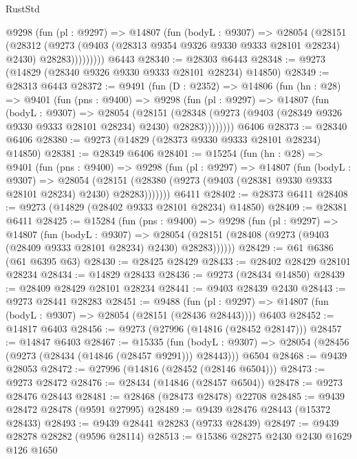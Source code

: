 \begin{lexlean}{RustStd}
\begin{coremodule}
{\begin{coremodule}
{{{{{{{{{{{{{{{{{{{{{{{{{{{{{{{{{{{{{{{{{{{{{{{{{{{{{{{          @9298
            (fun (pl : @9297) =>
            @14807
              (fun (bodyL : @9307) =>
              @28054
                (@28151
                  (@28312
                    (@9273
                      (@9403 (@28313 @9354 @9326 @9330 @9333 @28101 @28234) @2430)
                      @28283)))))))))
    @6443
@28340 := @28303 @6443
@28348 := @9273 (@14829 (@28340 @9326 @9330 @9333 @28101 @28234) @14850)
@28349 := @28313 @6443
@28372 := @9491
    (fun (D : @2352) =>
    @14806
      (fun (hn : @28) =>
      @9401
        (fun (pns : @9400) =>
        @9298
          (fun (pl : @9297) =>
          @14807
            (fun (bodyL : @9307) =>
            @28054
              (@28151
                (@28348 (@9273 (@9403 (@28349 @9326 @9330 @9333 @28101 @28234) @2430) @28283))))))))
    @6406
@28373 := @28340 @6406
@28380 := @9273 (@14829 (@28373 @9330 @9333 @28101 @28234) @14850)
@28381 := @28349 @6406
@28401 := @15254
    (fun (hn : @28) =>
    @9401
      (fun (pns : @9400) =>
      @9298
        (fun (pl : @9297) =>
        @14807
          (fun (bodyL : @9307) =>
          @28054
            (@28151 (@28380 (@9273 (@9403 (@28381 @9330 @9333 @28101 @28234) @2430) @28283)))))))
    @6411
@28402 := @28373 @6411
@28408 := @9273 (@14829 (@28402 @9333 @28101 @28234) @14850)
@28409 := @28381 @6411
@28425 := @15284
    (fun (pns : @9400) =>
    @9298
      (fun (pl : @9297) =>
      @14807
        (fun (bodyL : @9307) =>
        @28054 (@28151 (@28408 (@9273 (@9403 (@28409 @9333 @28101 @28234) @2430) @28283))))))
@28429 := @61 @6386 (@61 @6395 @63)
@28430 := @28425 @28429
@28433 := @28402 @28429 @28101 @28234
@28434 := @14829 @28433
@28436 := @9273 (@28434 @14850)
@28439 := @28409 @28429 @28101 @28234
@28441 := @9403 @28439 @2430
@28443 := @9273 @28441 @28283
@28451 := @9488
    (fun (pl : @9297) => @14807 (fun (bodyL : @9307) => @28054 (@28151 (@28436 @28443))))
    @6403
@28452 := @14817 @6403
@28456 := @9273 (@27996 (@14816 (@28452 @28147)))
@28457 := @14847 @6403
@28467 := @15335
    (fun (bodyL : @9307) => @28054 (@28456 (@9273 (@28434 (@14846 (@28457 @9291))) @28443)))
    @6504
@28468 := @9439 @28053
@28472 := @27996 (@14816 (@28452 (@28146 @6504)))
@28473 := @9273 @28472
@28476 := @28434 (@14846 (@28457 @6504))
@28478 := @9273 @28476 @28443
@28481 := @28468 (@28473 @28478) @22708
@28485 := @9439 @28472 @28478 (@9591 @27995)
@28489 := @9439 @28476 @28443 (@15372 @28433)
@28493 := @9439 @28441 @28283 (@9733 @28439)
@28497 := @9439 @28278 @28282 (@9596 @28114)
@28513 := @15386
    @28275
    @2430
    @2430
    @1629
    @126
    @1650
}}}}}}}}}}}}}}}}}}}}}}}}}}}}}}}}}}}}}}}}}}}}}}}}}}}}}}}
\end{coremodule}}
\end{coremodule}
\end{lexlean}
